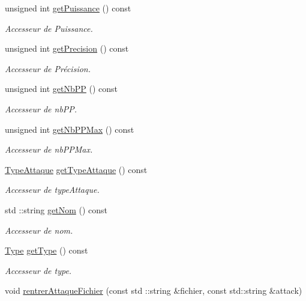 \begin{DoxyCompactItemize}
unsigned int \hyperlink{class_attaque_a92ae062d505e82c80621069dc6a917d1}{get\+Puissance} () const
\begin{DoxyCompactList}\small\item\em Accesseur de Puissance. \end{DoxyCompactList}\item 
unsigned int \hyperlink{class_attaque_ada8c22f0becc001b46e6a7f2da00a1ef}{get\+Precision} () const
\begin{DoxyCompactList}\small\item\em Accesseur de Précision. \end{DoxyCompactList}\item 
unsigned int \hyperlink{class_attaque_aa95b1e494a9c24dfd28c585e46cd1eb8}{get\+Nb\+PP} () const
\begin{DoxyCompactList}\small\item\em Accesseur de nb\+PP. \end{DoxyCompactList}\item 
unsigned int \hyperlink{class_attaque_a651deeca5e47dd04929bd1c9d013c86e}{get\+Nb\+P\+P\+Max} () const
\begin{DoxyCompactList}\small\item\em Accesseur de nb\+P\+P\+Max. \end{DoxyCompactList}\item 
\hyperlink{_attaque_8h_acefba67470a7a2e69ed731d28d318e64}{Type\+Attaque} \hyperlink{class_attaque_acb25c596d5b90b2330d3188749bc130d}{get\+Type\+Attaque} () const
\begin{DoxyCompactList}\small\item\em Accesseur de type\+Attaque. \end{DoxyCompactList}\item 
std \+::string \hyperlink{class_attaque_a2d3e865f856f681f79934680b25ac372}{get\+Nom} () const
\begin{DoxyCompactList}\small\item\em Accesseur de nom. \end{DoxyCompactList}\item 
\hyperlink{_attaque_8h_a1d1cfd8ffb84e947f82999c682b666a7}{Type} \hyperlink{class_attaque_af43d72ec9abad98f04e21e245cece692}{get\+Type} () const
\begin{DoxyCompactList}\small\item\em Accesseur de type. \end{DoxyCompactList}\item 
void \hyperlink{class_attaque_ac6a1ff465a27d926b72807354e6587eb}{rentrer\+Attaque\+Fichier} (const std \+::string \&fichier, const std\+::string \&attack)

\end{DoxyCompactItemize}
